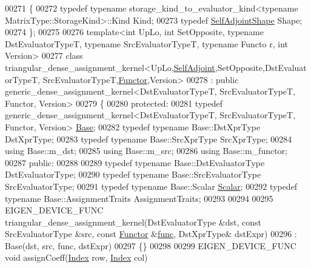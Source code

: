 \begin{DoxyCode}
00271 \{
00272   \textcolor{keyword}{typedef} \textcolor{keyword}{typename} storage\_kind\_to\_evaluator\_kind<typename MatrixType::StorageKind>::Kind Kind;
00273   \textcolor{keyword}{typedef} \hyperlink{struct_eigen_1_1_self_adjoint_shape}{SelfAdjointShape} Shape;
00274 \};
00275 
00276 \textcolor{keyword}{template}<\textcolor{keywordtype}{int} UpLo, \textcolor{keywordtype}{int} SetOpposite, \textcolor{keyword}{typename} DstEvaluatorTypeT, \textcolor{keyword}{typename} SrcEvaluatorTypeT, \textcolor{keyword}{typename} Functo
      r, \textcolor{keywordtype}{int} Version>
00277 \textcolor{keyword}{class }triangular\_dense\_assignment\_kernel<UpLo,\hyperlink{group__enums_gga39e3366ff5554d731e7dc8bb642f83cda2491fc6765056421f504eb7e16083e8f}{SelfAdjoint},SetOpposite,DstEvaluatorTypeT,
      SrcEvaluatorTypeT,\hyperlink{struct_functor}{Functor},Version>
00278   : \textcolor{keyword}{public} generic\_dense\_assignment\_kernel<DstEvaluatorTypeT, SrcEvaluatorTypeT, Functor, Version>
00279 \{
00280 \textcolor{keyword}{protected}:
00281   \textcolor{keyword}{typedef} generic\_dense\_assignment\_kernel<DstEvaluatorTypeT, SrcEvaluatorTypeT, Functor, Version> 
      \hyperlink{group___core___module_class_eigen_1_1_triangular_base}{Base};
00282   \textcolor{keyword}{typedef} \textcolor{keyword}{typename} Base::DstXprType DstXprType;
00283   \textcolor{keyword}{typedef} \textcolor{keyword}{typename} Base::SrcXprType SrcXprType;
00284   \textcolor{keyword}{using} Base::m\_dst;
00285   \textcolor{keyword}{using} Base::m\_src;
00286   \textcolor{keyword}{using} Base::m\_functor;
00287 \textcolor{keyword}{public}:
00288   
00289   \textcolor{keyword}{typedef} \textcolor{keyword}{typename} Base::DstEvaluatorType DstEvaluatorType;
00290   \textcolor{keyword}{typedef} \textcolor{keyword}{typename} Base::SrcEvaluatorType SrcEvaluatorType;
00291   \textcolor{keyword}{typedef} \textcolor{keyword}{typename} Base::Scalar \hyperlink{group___core___module_af52acc0942ece2de9b6db4a99cc6656e}{Scalar};
00292   \textcolor{keyword}{typedef} \textcolor{keyword}{typename} Base::AssignmentTraits AssignmentTraits;
00293   
00294   
00295   EIGEN\_DEVICE\_FUNC triangular\_dense\_assignment\_kernel(DstEvaluatorType &dst, \textcolor{keyword}{const} SrcEvaluatorType &src, \textcolor{keyword}{
      const} \hyperlink{struct_functor}{Functor} &\hyperlink{structfunc}{func}, DstXprType& dstExpr)
00296     : Base(dst, src, func, dstExpr)
00297   \{\}
00298   
00299   EIGEN\_DEVICE\_FUNC \textcolor{keywordtype}{void} assignCoeff(\hyperlink{group___core___module_a554f30542cc2316add4b1ea0a492ff02}{Index} row, \hyperlink{group___core___module_a554f30542cc2316add4b1ea0a492ff02}{Index} col)

\end{DoxyCode}
